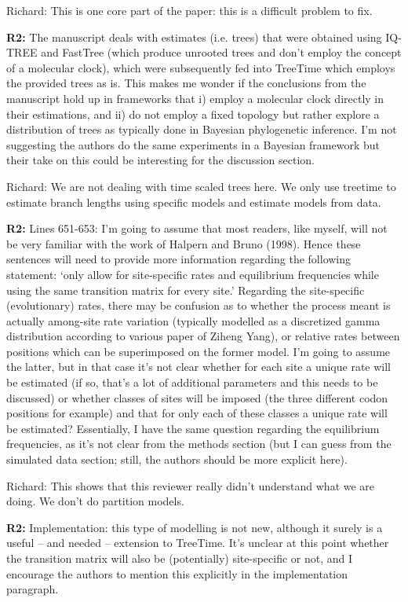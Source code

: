\documentclass[aps,rmp,onecolumn]{revtex4-1}
\newcommand{\Richard}[1]{{\color{drab}Richard: #1}}
\newcommand{\refb}[1]{\textbf{R2:} #1}
\begin{document}
\Richard{This is one core part of the paper: this is a difficult problem to fix. }


\refb{The manuscript deals with estimates (i.e. trees) that were obtained using IQ-TREE and FastTree (which produce unrooted trees and don’t employ the concept of a molecular clock), which were subsequently fed into TreeTime which employs the provided trees as is. This makes me wonder if the conclusions from the manuscript hold up in frameworks that i) employ a molecular clock directly in their estimations, and ii) do not employ a fixed topology but rather explore a distribution of trees as typically done in Bayesian phylogenetic inference. I’m not suggesting the authors do the same experiments in a Bayesian framework but their take on this could be interesting for the discussion section.}

\Richard{We are not dealing with time scaled trees here. We only use treetime to estimate branch lengths using specific models and estimate models from data.}


\refb{Lines 651-653: I’m going to assume that most readers, like myself, will not be very familiar with the work of Halpern and Bruno (1998). Hence these sentences will need to provide more information regarding the following statement: ‘only allow for site-specific rates and equilibrium frequencies while using the same transition matrix for every site.’ Regarding the site-specific (evolutionary) rates, there may be confusion as to whether the process meant is actually among-site rate variation (typically modelled as a discretized gamma distribution according to various paper of Ziheng Yang), or relative rates between positions which can be superimposed on the former model. I’m going to assume the latter, but in that case it’s not clear whether for each site a unique rate will be estimated (if so, that’s a lot of additional parameters and this needs to be discussed) or whether classes of sites will be imposed (the three different codon positions for example) and that for only each of these classes a unique rate will be estimated? Essentially, I have the same question regarding the equilibrium frequencies, as it’s not clear from the methods section (but I can guess from the simulated data section; still, the authors should be more explicit here).}

\Richard{This shows that this reviewer really didn't understand what we are doing. We don't do partition models. }


\refb{Implementation: this type of modelling is not new, although it surely is a useful -- and needed -- extension to TreeTime. It’s unclear at this point whether the transition matrix will also be (potentially) site-specific or not, and I encourage the authors to mention this explicitly in the implementation paragraph.}
\end{document}
